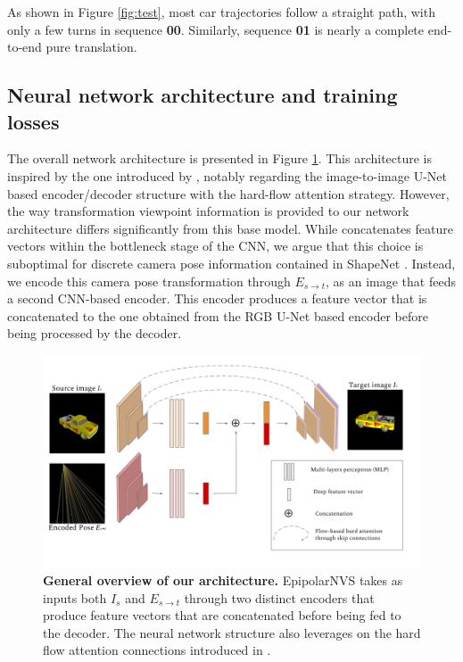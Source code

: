   
As shown in Figure \ref{fig:test}, most car trajectories follow a straight path, with only a few turns in sequence \textbf{00}. Similarly, sequence \textbf{01} is nearly a complete end-to-end pure translation.

\subsection{Neural network architecture and training losses}

The overall network architecture is presented in Figure \ref{fig:architecture}. This architecture is inspired by the one introduced by \citep{kim2020novel}, notably regarding the image-to-image U-Net based encoder/decoder structure with the hard-flow attention strategy. However, the way transformation viewpoint information is provided to our network architecture differs significantly from this base model. While \citep{kim2020novel} concatenates feature vectors within the bottleneck stage of the \ac{CNN}, we argue that this choice is suboptimal for discrete camera pose information contained in ShapeNet \citep{chang2015shapenet}. Instead, we encode this camera pose transformation through $E_{s\xrightarrow{}t}$, as an image that feeds a second \ac{CNN}-based encoder. This encoder produces a feature vector that is concatenated to the one obtained from the RGB U-Net based encoder before being processed by the decoder. 

\begin{figure}[h!]
  \begin{center}
  \includegraphics[width=\textwidth]{images/epipolarnvs/NetworkArchitecture.png}
  \end{center}
  \caption{\textbf{General overview of our architecture.} EpipolarNVS takes as inputs both $I_s$ and $E_{s\xrightarrow{}t}$ through two distinct encoders that produce feature vectors that are concatenated before being fed to the decoder. The neural network structure also leverages on the hard flow attention connections introduced in \citep{kim2020novel}.}
  \label{fig:architecture}
\end{figure}

